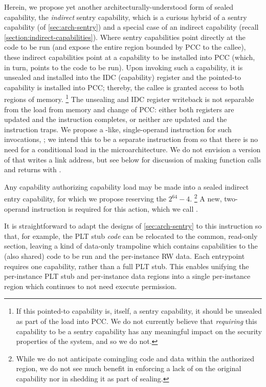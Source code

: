 Herein, we propose yet another architecturally-understood form of sealed
capability, the \emph{indirect} sentry capability, which is a curious
hybrid of a sentry capability (of \cref{sec:arch-sentry}) and a special
case of an indirect capability (recall \cref{section:indirect-capabilities}).
Where sentry capabilities point directly at the code to be run (and
expose the entire region bounded by PCC to the callee), these indirect
capabilities point at a capability to be installed into PCC (which, in turn,
points to the code to be run).  Upon invoking such a capability, it is unsealed
and installed into the IDC (capability) register and the pointed-to capability
is installed into PCC; thereby, the callee is granted access to both regions of
memory.%
%
\footnote{If this pointed-to capability is, itself, a sentry capability,
it should be unsealed as part of the load into PCC.  We do not currently
believe that \emph{requiring} this capability to be a sentry capability
has any meaningful impact on the security properties of the system, and so we
do not.}
%
The unsealing and IDC register writeback is not separable from the load from
memory and change of PCC: either both registers are updated and the instruction
completes, or neither are updated and the instruction traps.  We propose a
-like, single-operand instruction for such invocations,
; we intend this to be a separate instruction from
 so that there is no need for a conditional load in the
microarchitecture.  We do not envision a version of 
that writes a link address, but see below for discussion of making function
calls and returns with .

Any capability authorizing capability load may be made into a sealed indirect
entry capability, for which we propose reserving the \cotype{} $2^{64} - 4$.%
%
\footnote{While we do not anticipate comingling code and data within the
authorized region, we do not see much benefit in enforcing a lack of
\cappermX on the original capability nor in shedding it as part of
sealing.
%
%
}
%
A new, two-operand instruction is required for this action, which we call
.

It is straightforward to adapt the designs of \cref{sec:arch-sentry} to this
instruction so that, for example, the PLT stub \emph{code} can be relocated to
the common, read-only section, leaving a kind of data-only trampoline which
contains capabilities to the (also shared) code to be run and the per-instance
RW data.  Each entrypoint requires one capability, rather than a full PLT stub.
This enables unifying the per-instance PLT stub and per-instance data regions
into a single per-instance region which continues to not need execute
permission.

